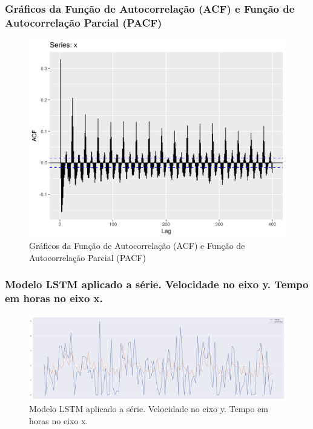 \documentclass{beamer}
\begin{document}
\begin{frame}
	\frametitle{Gráficos da Função de Autocorrelação (ACF) e Função de Autocorrelação Parcial (PACF)}
	\begin{figure}
		\centering
		\includegraphics[width=\textwidth]{long_memory_lagmax.png}
		\caption{Gráficos da Função de Autocorrelação (ACF) e Função de Autocorrelação Parcial (PACF)}
	\end{figure}
\end{frame}

\begin{frame}
	\frametitle{Modelo LSTM aplicado a série. Velocidade no eixo y. Tempo em horas no eixo x.}
	\begin{figure}
		\centering
		\includegraphics[width=\textwidth]{lstm.png}
		\caption{Modelo LSTM aplicado a série. Velocidade no eixo y. Tempo em horas no eixo x.}
	\end{figure}
\end{frame}
\end{document}
